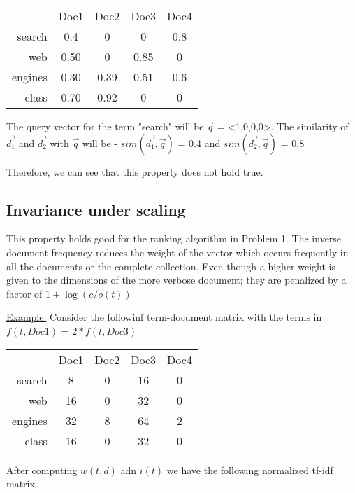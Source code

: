 \documentclass{article}
\begin{document}
\begin{tabular}{ r|c|c|c|c| }
\multicolumn{1}{r}{}
 & \multicolumn{1}{c}{Doc1}
 & \multicolumn{1}{c}{Doc2}
 & \multicolumn{1}{c}{Doc3}
 & \multicolumn{1}{c}{Doc4} \\
\cline{2-5}
search & 0.4 & 0 & 0 & 0.8 \\
\cline{2-5}
web & 0.50 & 0 & 0.85 & 0 \\
\cline{2-5}
engines & 0.30 & 0.39 & 0.51 & 0.6 \\
\cline{2-5}
class & 0.70 & 0.92 & 0 & 0 \\
\cline{2-5}
\end{tabular}

The query vector for the term "search" will be $\vec{q}$ = <1,0,0,0>. The similarity of $\vec{d_1}$ and $\vec{d_2}$ with ${\vec{q}}$ will be -
$sim(\vec{d_1},\vec{q})$ = 0.4 and $sim(\vec{d_2},\vec{q})$ = 0.8

Therefore, we can see that this property does not hold true. 

\subsection{\textbf{Invariance under scaling}}

This property holds good for the ranking algorithm in Problem 1. The inverse document frequency reduces the weight of the vector which occurs frequently in all the documents or the complete collection. Even though a higher weight is given to the dimensions of the more verbose document; they are penalized by a factor of $1 + \log(c/o(t))$ 

\underline{Example:}
Consider the followinf term-document matrix with the terms in $f(t,Doc1)$ = $2 * f(t,Doc3)$

\begin{tabular}{ r|c|c|c|c| }
\multicolumn{1}{r}{}
 & \multicolumn{1}{c}{Doc1}
 & \multicolumn{1}{c}{Doc2}
 & \multicolumn{1}{c}{Doc3}
 & \multicolumn{1}{c}{Doc4} \\
\cline{2-5}
search & 8 & 0 & 16 & 0 \\
\cline{2-5}
web & 16 & 0 & 32 & 0 \\
\cline{2-5}
engines & 32 & 8 & 64 & 2 \\
\cline{2-5}
class & 16 & 0 & 32 & 0 \\
\cline{2-5}
\end{tabular}

After computing $w(t,d)$ adn $i(t)$ we have the following normalized tf-idf matrix -
\end{document}
